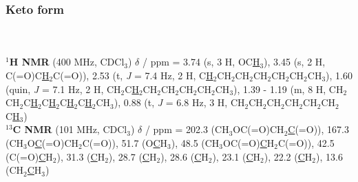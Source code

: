 \subsubsection*{Keto form }%
\\[1\baselineskip]
\\[1\baselineskip]
\textbf{$^{1}$H NMR} (400 MHz, CDCl$_3$) $\delta$ / ppm = 
	3.74 (s, 3 H, OC\underline{H}$_3$), 
	3.45 (s, 2 H, C(=O)C\underline{H}$_2$C(=O)), 
	2.53 (t, \textit{J} = 7.4 Hz, 2 H, C\underline{H}$_2$CH$_2$CH$_2$CH$_2$CH$_2$CH$_2$CH$_3$), 
	1.60 (quin, \textit{J} = 7.1 Hz, 2 H, CH$_2$C\underline{H}$_2$CH$_2$CH$_2$CH$_2$CH$_2$CH$_3$),
	1.39 - 1.19 (m, 8 H, CH$_2$CH$_2$C\underline{H}$_2$C\underline{H}$_2$C\underline{H}$_2$C\underline{H}$_2$CH$_3$), 
	0.88 (t, \textit{J} = 6.8 Hz, 3 H,    CH$_2$CH$_2$CH$_2$CH$_2$CH$_2$CH$_2$C\underline{H}$_3$)
\\[1\baselineskip]
\textbf{$^{13}$C NMR} (101 MHz, CDCl$_3$) $\delta$ / ppm = 
	202.3 (CH$_3$OC(=O)CH$_2$\underline{C}(=O)), 
	167.3 (CH$_3$O\underline{C}(=O)CH$_2$C(=O)),
	51.7 (O\underline{C}H$_3$), 
	48.5 (CH$_3$OC(=O)\underline{C}H$_2$C(=O)), 
	42.5 (C(=O)\underline{C}H$_2$), 
	31.3 (\underline{C}H$_2$), 
	28.7 (\underline{C}H$_2$), 
	28.6 (\underline{C}H$_2$), 
	23.1 (\underline{C}H$_2$), 
	22.2 (\underline{C}H$_2$), 
	13.6 (CH$_2$\underline{C}H$_3$)
\\[1\baselineskip]
